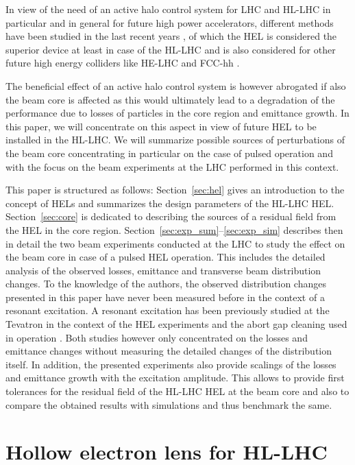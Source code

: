 \documentclass[%
 reprint,
 amsmath,amssymb,
 aps,
prstab,
]{revtex4-1}
\begin{document}
In view of the need of an active halo control system for LHC and HL-LHC in particular and in general for future high power accelerators, different methods have been studied in the last recent years \cite{helreview_bruce}, of which the HEL is considered the superior device at least in case of the HL-LHC \cite{helreview} and is also considered for other future high energy colliders like HE-LHC and FCC-hh \cite{helhcparam2011,fccparam2016}.

The beneficial effect of an active halo control system is however abrogated if also the beam core is affected as this would ultimately lead to a degradation of the performance due to losses of particles in the core region and emittance growth. In this paper, we will concentrate on this aspect in view of future HEL to be installed in the HL-LHC. We will summarize possible sources of perturbations of the beam core concentrating in particular on the case of pulsed operation and with the focus on the beam experiments at the LHC performed in this context.

This paper is structured as follows: Section~\ref{sec:hel} gives an introduction to the concept of HELs and summarizes the design parameters of the HL-LHC HEL. Section~\ref{sec:core} is dedicated to describing the sources of a residual field from the HEL in the core region. Section~\ref{sec:exp_sum}--\ref{sec:exp_sim} describes then in detail the two beam experiments conducted at the LHC to study the effect on the beam core in case of a pulsed HEL operation. This includes the detailed analysis of the observed losses, emittance and transverse beam distribution changes. To the knowledge of the authors, the observed distribution changes presented in this paper have never been measured before in the context of a resonant excitation. A resonant excitation has been previously studied at the Tevatron in the context of the HEL experiments \cite{hel_tevatron_stancari} and the abort gap cleaning used in operation \cite{hel_tevatron_abortgap_zhang}. Both studies however only concentrated on the losses and emittance changes without measuring the detailed changes of the distribution itself. In addition, the presented experiments also provide scalings of the losses and emittance growth with the excitation amplitude. This allows to provide first tolerances for the residual field of the HL-LHC HEL at the beam core and also to compare the obtained results with simulations and thus benchmark the same.

\section{Hollow electron lens for HL-LHC\label{sec:hel}}
\end{document}
